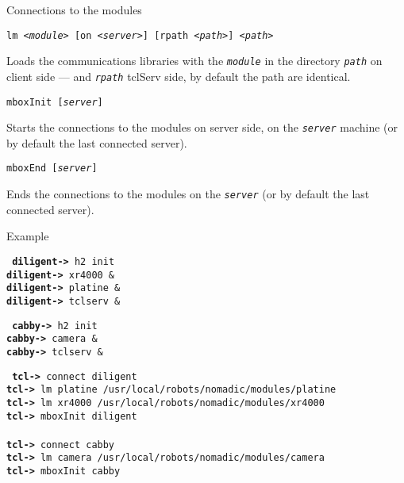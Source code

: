 \documentclass[a4paper,landscape,smooth]{show}
\begin{document}

\begin{tslide}{Connections to the modules}
   \vfill
   \begin{cartouche}
   \texttt{lm {\em <module>} [on {\em <server>}] [rpath {\em<path>}] {\em <path>}}
   \end{cartouche}   
   Loads the communications libraries with the \texttt{\em module}
   in the directory \texttt{\em path} on client side --- and
   \texttt{\em rpath} tclServ side, by default the path are identical.
   \vfill
   \begin{cartouche}
   \texttt{mboxInit [{\em server}]}
   \end{cartouche}   
    Starts the connections to the modules on server side, on the 
   \texttt{\em server} machine (or by default the last connected server).
   \vfill
   \begin{cartouche}
   \texttt{mboxEnd [{\em server}]}
   \end{cartouche}   
   Ends the connections to the modules on the \texttt{\em server} (or by
   default the last connected server).
   \vfill
\end{tslide}


\begin{tslide}{Example}
   \vfill
   \parbox{0.45\linewidth}{\tt
      {\bf diligent->} h2 init\\
      {\bf diligent->} xr4000 \&\\
      {\bf diligent->} platine \&\\
      {\bf diligent->} tclserv \&\\
   }\hfill\parbox{0.45\linewidth}{\tt
      {\bf cabby->} h2 init\\
      {\bf cabby->} camera \&\\
      {\bf cabby->} tclserv \&\\
   }
   \vfill
   {\tt
      {\bf tcl->} connect diligent\\
      {\bf tcl->} lm platine /usr/local/robots/nomadic/modules/platine\\
      {\bf tcl->} lm xr4000 /usr/local/robots/nomadic/modules/xr4000\\
      {\bf tcl->} mboxInit diligent\\
\\
      {\bf tcl->} connect cabby\\
      {\bf tcl->} lm camera /usr/local/robots/nomadic/modules/camera\\
      {\bf tcl->} mboxInit cabby\\
   }
   \vfill
\end{tslide}
\end{document}
